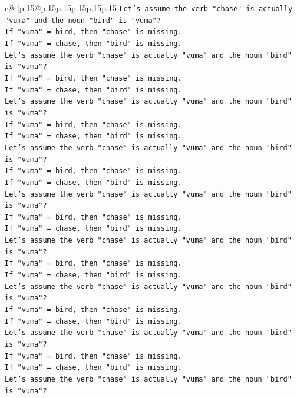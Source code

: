 \documentclass{article}
\begin{document}
{\begin{supertabular}{c@{$\;$}|p{.15\linewidth}@{}p{.15\linewidth}p{.15\linewidth}p{.15\linewidth}p{.15\linewidth}p{.15\linewidth}}
{{{\texttt{Let's assume the verb "chase" is actually "vuma" and the noun "bird" is "vuma"?} \\
\texttt{If "vuma" = bird, then "chase" is missing.} \\
\texttt{If "vuma" = chase, then "bird" is missing.} \\
\texttt{Let's assume the verb "chase" is actually "vuma" and the noun "bird" is "vuma"?} \\
\texttt{If "vuma" = bird, then "chase" is missing.} \\
\texttt{If "vuma" = chase, then "bird" is missing.} \\
\texttt{Let's assume the verb "chase" is actually "vuma" and the noun "bird" is "vuma"?} \\
\texttt{If "vuma" = bird, then "chase" is missing.} \\
\texttt{If "vuma" = chase, then "bird" is missing.} \\
\texttt{Let's assume the verb "chase" is actually "vuma" and the noun "bird" is "vuma"?} \\
\texttt{If "vuma" = bird, then "chase" is missing.} \\
\texttt{If "vuma" = chase, then "bird" is missing.} \\
\texttt{Let's assume the verb "chase" is actually "vuma" and the noun "bird" is "vuma"?} \\
\texttt{If "vuma" = bird, then "chase" is missing.} \\
\texttt{If "vuma" = chase, then "bird" is missing.} \\
\texttt{Let's assume the verb "chase" is actually "vuma" and the noun "bird" is "vuma"?} \\
\texttt{If "vuma" = bird, then "chase" is missing.} \\
\texttt{If "vuma" = chase, then "bird" is missing.} \\
\texttt{Let's assume the verb "chase" is actually "vuma" and the noun "bird" is "vuma"?} \\
\texttt{If "vuma" = bird, then "chase" is missing.} \\
\texttt{If "vuma" = chase, then "bird" is missing.} \\
\texttt{Let's assume the verb "chase" is actually "vuma" and the noun "bird" is "vuma"?} \\
\texttt{If "vuma" = bird, then "chase" is missing.} \\
\texttt{If "vuma" = chase, then "bird" is missing.} \\
\texttt{Let's assume the verb "chase" is actually "vuma" and the noun "bird" is "vuma"?} \\
}}}
\end{supertabular}}
\end{document}
